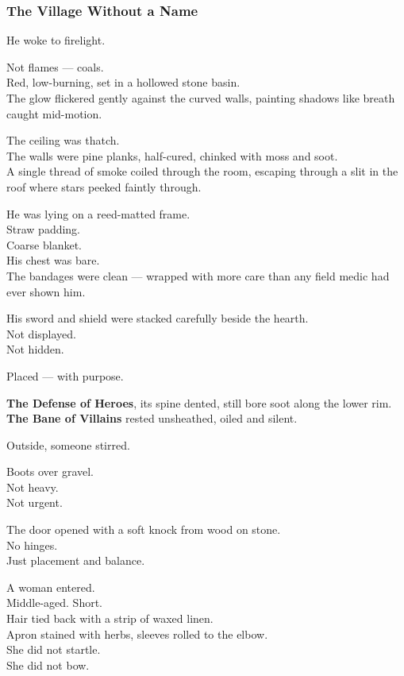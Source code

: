 \documentclass[12pt]{article}
\begin{document}
\subsubsection{The Village Without a Name}

He woke to firelight.

Not flames — coals.\\
Red, low-burning, set in a hollowed stone basin.\\
The glow flickered gently against the curved walls, painting shadows like breath caught mid-motion.

The ceiling was thatch.\\
The walls were pine planks, half-cured, chinked with moss and soot.\\
A single thread of smoke coiled through the room, escaping through a slit in the roof where stars peeked faintly through.

He was lying on a reed-matted frame.\\
Straw padding.\\
Coarse blanket.\\
His chest was bare.\\
The bandages were clean — wrapped with more care than any field medic had ever shown him.

\vspace{1em}

His sword and shield were stacked carefully beside the hearth.\\
Not displayed.\\
Not hidden.

Placed — with purpose.

\textbf{The Defense of Heroes}, its spine dented, still bore soot along the lower rim.\\
\textbf{The Bane of Villains} rested unsheathed, oiled and silent.

\vspace{1em}

Outside, someone stirred.

Boots over gravel.\\
Not heavy.\\
Not urgent.

The door opened with a soft knock from wood on stone.\\
No hinges.\\
Just placement and balance.

A woman entered.\\
Middle-aged. Short.\\
Hair tied back with a strip of waxed linen.\\
Apron stained with herbs, sleeves rolled to the elbow.\\
She did not startle.\\
She did not bow.
\end{document}
